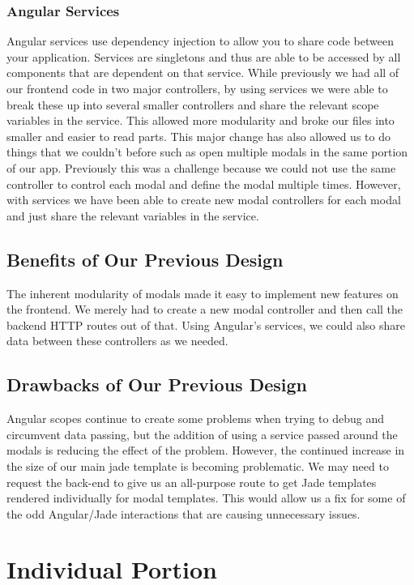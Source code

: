 \documentclass[11pt]{article}   %
\begin{document}
\subsubsection{Angular Services}

Angular services use dependency injection to allow you to share code between your application. Services are singletons and thus are able to be accessed by all components that are dependent on that service. While previously we had all of our frontend code in two major controllers, by using services we were able to break these up into several smaller controllers and share the relevant scope variables in the service. This allowed more modularity and broke our files into smaller and easier to read parts. This major change has also allowed us to do things that we couldn't before such as open multiple modals in the same portion of our app. Previously this was a challenge because we could not use the same controller to control each modal and define the modal multiple times. However, with services we have been able to create new modal controllers for each modal and just share the relevant variables in the service.

\subsection{Benefits of Our Previous Design}

The inherent modularity of modals made it easy to implement new features on the frontend. We merely had to create a new modal controller and then call the backend HTTP routes out of that. Using Angular's services, we could also share data between these controllers as we needed.

\subsection{Drawbacks of Our Previous Design}

Angular scopes continue to create some problems when trying to debug and circumvent data passing, but the addition of using a service passed around the modals is reducing the effect of the problem. However, the continued increase in the size of our main jade template is becoming problematic. We may need to request the back-end to give us an all-purpose route to get Jade templates rendered individually for modal templates. This would allow us a fix for some of the odd Angular/Jade interactions that are causing unnecessary issues.

\section{Individual Portion}
\end{document}
